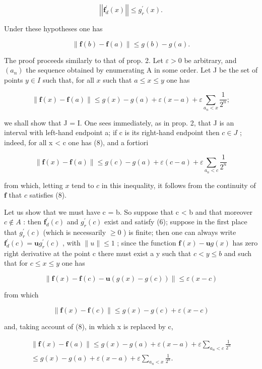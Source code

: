 \[
\left| \left| \mathbf {f} _ {d} ^ {\prime} (x) \right| \right| \leqslant g _ {r} ^ {\prime} (x).\tag{6}
\]

Under these hypotheses one has

\[
\| \mathbf {f} (b) - \mathbf {f} (a) \| \leqslant g (b) - g (a).\tag{7}
\]

The proof proceeds similarly to that of prop. 2. Let \(\varepsilon > 0\) be arbitrary, and \((a_{n})\) the sequence obtained by enumerating A in some order. Let J be the set of points \(y \in I\) such that, for all \(x\) such that \(a \leqslant x \leqslant y\) one has

\[
\| \mathbf {f} (x) - \mathbf {f} (a) \| \leqslant g (x) - g (a) + \varepsilon (x - a) + \varepsilon \sum_ {a _ {n} <   x} \frac {1}{2 ^ {n}};\tag{8}
\]

we shall show that J = I. One sees immediately, as in prop. 2, that J is an interval with left-hand endpoint a; if c is its right-hand endpoint then \(c \in J\) ; indeed, for all x \textless{} c one has (8), and a fortiori

\[
\| \mathbf {f} (x) - \mathbf {f} (a) \| \leqslant g (c) - g (a) + \varepsilon (c - a) + \varepsilon \sum_ {a _ {n} <   c} \frac {1}{2 ^ {n}}
\]

from which, letting \(x\) tend to \(c\) in this inequality, it follows from the continuity of \(\mathbf{f}\) that \(c\) satisfies (8).

Let us show that we must have c = b. So suppose that c \textless{} b and that moreover \(c \notin A\) : then \(\mathbf{f}_{d}^{\prime}(c)\) and \(g_{r}^{\prime}(c)\) exist and satisfy (6); suppose in the first place that \(g_{r}^{\prime}(c)\) (which is necessarily \(\geqslant 0\) ) is finite; then one can always write \(\mathbf{f}_{d}^{\prime}(c) = \mathbf{u}g_{r}^{\prime}(c)\) , with \(\|u\| \leqslant 1\) ; since the function \(\mathbf{f}(x) - \mathbf{u}g(x)\) has zero right derivative at the point c there must exist a y such that \(c < y \leqslant b\) and such that for \(c \leqslant x \leqslant y\) one has

\[
\| \mathbf {f} (x) - \mathbf {f} (c) - \mathbf {u} (g (x) - g (c)) \| \leqslant \varepsilon (x - c)
\]

from which

\[
\| \mathbf {f} (x) - \mathbf {f} (c) \| \leqslant g (x) - g (c) + \varepsilon (x - c)
\]

and, taking account of (8), in which x is replaced by c,

\[
\begin{array}{c} \| \mathbf {f} (x) - \mathbf {f} (a) \| \leqslant g (x) - g (a) + \varepsilon (x - a) + \varepsilon \sum_ {a _ {n} <   c} \frac {1}{2 ^ {n}} \\ \leqslant g (x) - g (a) + \varepsilon (x - a) + \varepsilon \sum_ {a _ {n} <   x} \frac {1}{2 ^ {n}}. \end{array}
\]

